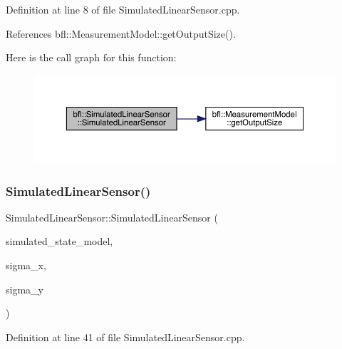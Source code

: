 Definition at line 8 of file Simulated\+Linear\+Sensor.\+cpp.



References bfl\+::\+Measurement\+Model\+::get\+Output\+Size().

Here is the call graph for this function\+:
\nopagebreak
\begin{figure}[H]
\begin{center}
\leavevmode
\includegraphics[width=350pt]{classbfl_1_1SimulatedLinearSensor_a8635098b474ee1a6601a857a3700728a_cgraph}
\end{center}
\end{figure}
\mbox{\label{classbfl_1_1SimulatedLinearSensor_ace695adab328d6472d1d314b1b9fa81a}} 
\subsubsection{\texorpdfstring{Simulated\+Linear\+Sensor()}{SimulatedLinearSensor()}\hspace{0.1cm}{\footnotesize\ttfamily [2/3]}}
{\footnotesize\ttfamily Simulated\+Linear\+Sensor\+::\+Simulated\+Linear\+Sensor (\begin{DoxyParamCaption}\item[{std\+::unique\+\_\+ptr$<$ \mbox{\hyperlink{classbfl_1_1SimulatedStateModel}{bfl\+::\+Simulated\+State\+Model}} $>$}]{simulated\+\_\+state\+\_\+model,  }\item[{const double}]{sigma\+\_\+x,  }\item[{const double}]{sigma\+\_\+y }\end{DoxyParamCaption})}



Definition at line 41 of file Simulated\+Linear\+Sensor.\+cpp.

\mbox{\label{classbfl_1_1SimulatedLinearSensor_aa347b51d54d290d1a3add38736f5b262}} 
